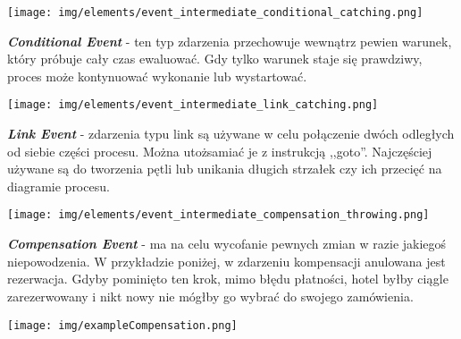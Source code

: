 \documentclass[declaration,shortabstract,mgr]{iithesis}
\begin{document}
\vspace{\mypointsep}

\noindent\begin{minipage}[t]{0.075\textwidth}\vspace{0pt}
\texttt{[image: img/elements/event\_intermediate\_conditional\_catching.png]}
\end{minipage}\hfill
\begin{minipage}[t]{0.875\textwidth}\vspace{0pt}
\textbf{\textit{Conditional Event}} - ten typ zdarzenia przechowuje wewnątrz pewien warunek, który próbuje cały czas ewaluować. Gdy tylko warunek staje się prawdziwy, proces może kontynuować wykonanie lub wystartować.
\end{minipage}

\vspace{\mypointsep}

\noindent\begin{minipage}[t]{0.075\textwidth}\vspace{0pt}
\texttt{[image: img/elements/event\_intermediate\_link\_catching.png]}
\end{minipage}\hfill
\begin{minipage}[t]{0.875\textwidth}\vspace{0pt}
\textbf{\textit{Link Event}} - zdarzenia typu link są używane w celu połączenie dwóch odległych od siebie części procesu. Można utożsamiać je z instrukcją ,,goto''. Najczęściej używane są do tworzenia pętli lub unikania długich strzałek czy ich przecięć na diagramie procesu.
\end{minipage}

\vspace{\mypointsep}

\noindent\begin{minipage}[t]{0.075\textwidth}\vspace{0pt}
\texttt{[image: img/elements/event\_intermediate\_compensation\_throwing.png]}
\end{minipage}\hfill
\begin{minipage}[t]{0.875\textwidth}\vspace{0pt}
\textbf{\textit{Compensation Event}} - ma na celu wycofanie pewnych zmian w razie jakiegoś niepowodzenia. W przykładzie poniżej, w zdarzeniu kompensacji anulowana jest rezerwacja. Gdyby pominięto ten krok, mimo błędu płatności, hotel byłby ciągle zarezerwowany i nikt nowy nie mógłby go wybrać do swojego zamówienia.
\begin{center}
\texttt{[image: img/exampleCompensation.png]}
\end{center}
\end{minipage}
\end{document}

